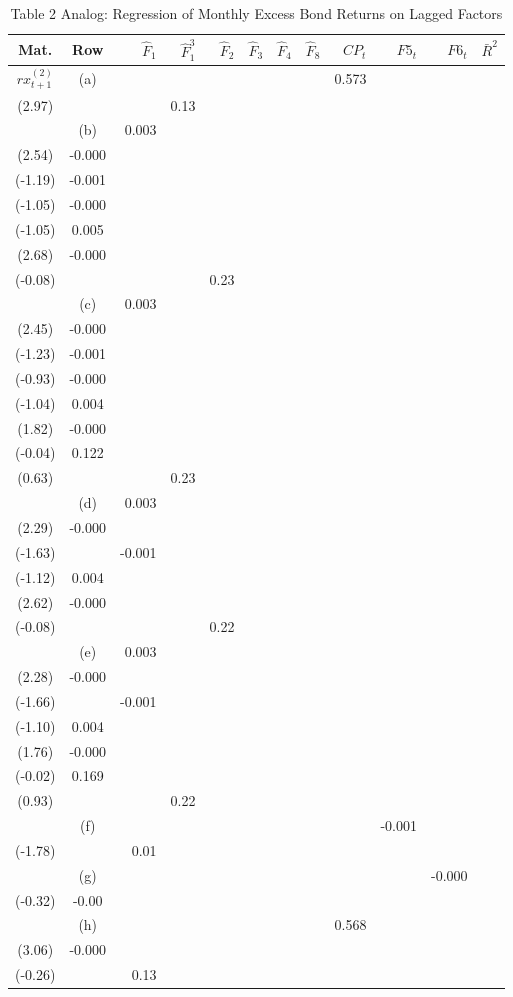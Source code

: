 \begin{table}[p]
\centering
\caption{Table 2 Analog: Regression of Monthly Excess Bond Returns on Lagged Factors}
\scriptsize
\begin{tabular}{ccrrrrrrrrrr}\hline
Mat. & Row & $\hat F_1$ & $\hat F_1^3$ & $\hat F_2$ & $\hat F_3$ & $\hat F_4$ & $\hat F_8$ & $CP_t$ & $F5_t$ & $F6_t$ & $\bar R^2$\\\hline
$rx^{(2)}_{t+1}$ & (a) &  &  &  &  &  &  & 0.573\\ (2.97) &  &  & 0.13\\
 & (b) & 0.003\\ (2.54) & -0.000\\ (-1.19) & -0.001\\ (-1.05) & -0.000\\ (-1.05) & 0.005\\ (2.68) & -0.000\\ (-0.08) &  &  &  & 0.23\\
 & (c) & 0.003\\ (2.45) & -0.000\\ (-1.23) & -0.001\\ (-0.93) & -0.000\\ (-1.04) & 0.004\\ (1.82) & -0.000\\ (-0.04) & 0.122\\ (0.63) &  &  & 0.23\\
 & (d) & 0.003\\ (2.29) & -0.000\\ (-1.63) &  & -0.001\\ (-1.12) & 0.004\\ (2.62) & -0.000\\ (-0.08) &  &  &  & 0.22\\
 & (e) & 0.003\\ (2.28) & -0.000\\ (-1.66) &  & -0.001\\ (-1.10) & 0.004\\ (1.76) & -0.000\\ (-0.02) & 0.169\\ (0.93) &  &  & 0.22\\
 & (f) &  &  &  &  &  &  &  & -0.001\\ (-1.78) &  & 0.01\\
 & (g) &  &  &  &  &  &  &  &  & -0.000\\ (-0.32) & -0.00\\
 & (h) &  &  &  &  &  &  & 0.568\\ (3.06) & -0.000\\ (-0.26) &  & 0.13\\

\end{tabular}
\end{table}
